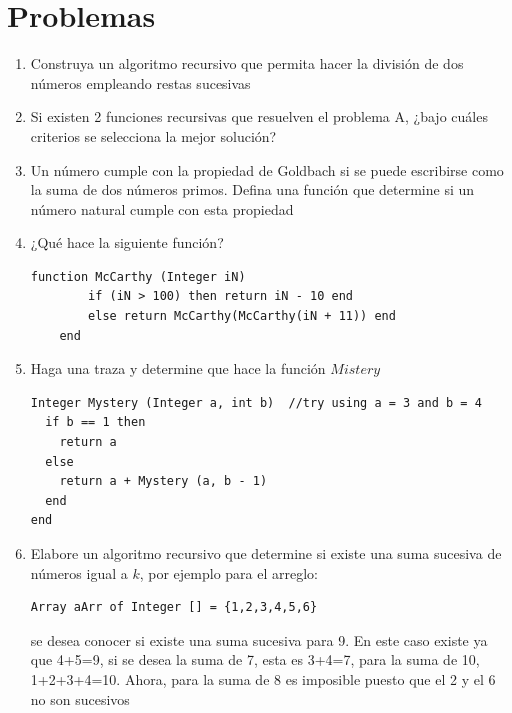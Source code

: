 \section{Problemas}

\begin{enumerate}
\item Construya un algoritmo recursivo que permita hacer la división de dos números empleando restas sucesivas
\item Si existen 2 funciones recursivas que resuelven el problema A, ¿bajo cuáles criterios se selecciona la mejor solución?
\item Un número cumple con la propiedad de Goldbach si se puede escribirse como la suma de dos números primos. Defina una función que determine si un número natural cumple con esta propiedad
\item ¿Qué hace la siguiente función?
	\begin{lstlisting}[upquote=true, language=pseudo]
	function McCarthy (Integer iN)
    	if (iN > 100) then return iN - 10 end
    	else return McCarthy(McCarthy(iN + 11)) end
    end
	\end{lstlisting}
\item Haga una traza y determine que hace la función $Mistery$
\begin{lstlisting}[upquote=true, language=pseudo]
Integer Mystery (Integer a, int b)	//try using a = 3 and b = 4
  if b == 1 then
	return a
  else
    return a + Mystery (a, b - 1)
  end
end
\end{lstlisting}
\item Elabore un algoritmo recursivo que determine si existe una suma sucesiva de números igual a $k$, por ejemplo para el arreglo:
\begin{lstlisting}[upquote=true, language=pseudo]
Array aArr of Integer [] = {1,2,3,4,5,6}
\end{lstlisting}
\noindent se desea conocer si existe una suma sucesiva para 9. En este caso existe ya que 4+5=9, si se desea la suma de 7, esta es 3+4=7, para la suma de 10, 1+2+3+4=10. Ahora, para la suma de 8 es imposible puesto que el 2 y el 6 no son sucesivos
\end{enumerate}